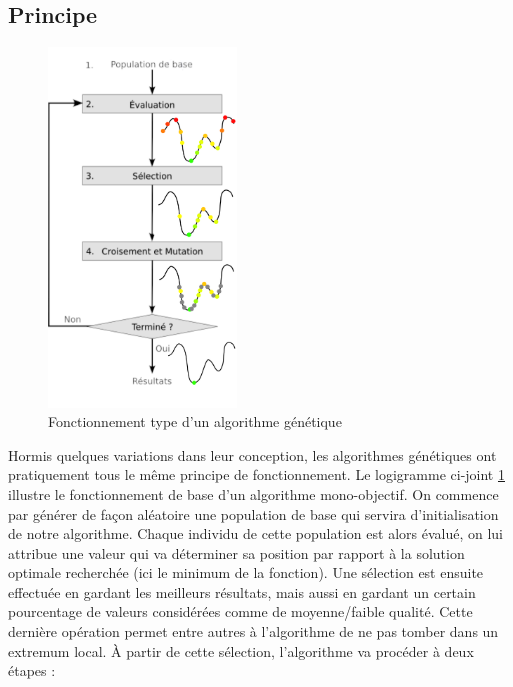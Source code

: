 \documentclass[12pt]{report}
\begin{document}
      \subsection{Principe}
        \begin{figure}
        \centering
        \includegraphics[width=5cm]{img/schema_algo_single.png}
        \caption{Fonctionnement type d'un algorithme génétique}
        \label{logi}
        \end{figure}
        Hormis quelques variations dans leur conception, les algorithmes génétiques ont pratiquement tous le même principe de fonctionnement.
        Le logigramme ci-joint \ref{logi} illustre le fonctionnement de base d'un algorithme mono-objectif.
        On commence par générer de façon aléatoire une population de base qui servira d'initialisation de notre algorithme.
        Chaque individu de cette population est alors évalué, on lui attribue une valeur qui va déterminer sa position par rapport à la solution optimale recherchée (ici le minimum de la fonction).
        Une sélection est ensuite effectuée en gardant les meilleurs résultats, mais aussi en gardant un certain pourcentage de valeurs considérées comme de moyenne/faible qualité. Cette dernière opération permet entre autres à l'algorithme de ne pas tomber dans un extremum local.
        À partir de cette sélection, l'algorithme va procéder à deux étapes :
\end{document}
